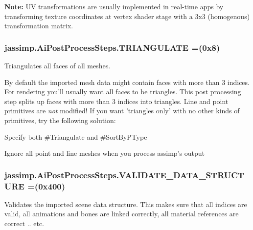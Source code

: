 {{\bfseries Note\+:} U\+V transformations are usually implemented in real-\/time apps by transforming texture coordinates at vertex shader stage with a 3x3 (homogenous) transformation matrix. \hypertarget{enumjassimp_1_1_ai_post_process_steps_a01837cc450eef4f697a8049dfe60ae49}{
\subsubsection[{T\+R\+I\+A\+N\+G\+U\+L\+A\+T\+E}]{\setlength{\rightskip}{0pt plus 5cm}jassimp.\+Ai\+Post\+Process\+Steps.\+T\+R\+I\+A\+N\+G\+U\+L\+A\+T\+E =(0x8)}}\label{enumjassimp_1_1_ai_post_process_steps_a01837cc450eef4f697a8049dfe60ae49}
Triangulates all faces of all meshes.

By default the imported mesh data might contain faces with more than 3 indices. For rendering you'll usually want all faces to be triangles. This post processing step splits up faces with more than 3 indices into triangles. Line and point primitives are {\itshape not} modified! If you want 'triangles only' with no other kinds of primitives, try the following solution\+: 
\begin{DoxyItemize}
\item Specify both \#\+Triangulate and \#\+Sort\+By\+P\+Type 
\item Ignore all point and line meshes when you process assimp's output 
\end{DoxyItemize}\hypertarget{enumjassimp_1_1_ai_post_process_steps_a67d8cbf3c7d36d28452d4aee89b81d01}{
\subsubsection[{V\+A\+L\+I\+D\+A\+T\+E\+\_\+\+D\+A\+T\+A\+\_\+\+S\+T\+R\+U\+C\+T\+U\+R\+E}]{\setlength{\rightskip}{0pt plus 5cm}jassimp.\+Ai\+Post\+Process\+Steps.\+V\+A\+L\+I\+D\+A\+T\+E\+\_\+\+D\+A\+T\+A\+\_\+\+S\+T\+R\+U\+C\+T\+U\+R\+E =(0x400)}}\label{enumjassimp_1_1_ai_post_process_steps_a67d8cbf3c7d36d28452d4aee89b81d01}
Validates the imported scene data structure. This makes sure that all indices are valid, all animations and bones are linked correctly, all material references are correct .. etc.

}
